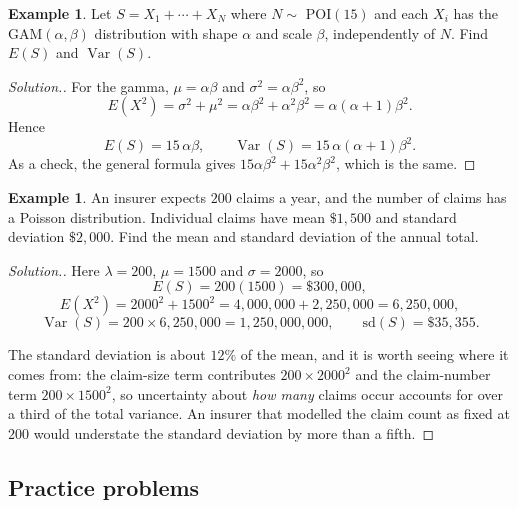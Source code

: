 \documentclass[11pt,a4paper]{article}
\theoremstyle{definition}
\newtheorem{exa}[thm]{Example}
\newenvironment{solution}
  {\renewcommand{\qedsymbol}{}\begin{proof}[\textit{Solution}.]}
  {\end{proof}}
\DeclareMathOperator{\Var}{Var}
\begin{document}
\begin{exa}
Let $S = X_1+\cdots+X_N$ where $N\sim$ POI$(15)$ and each $X_i$ has the
GAM$(\alpha,\beta)$ distribution with shape $\alpha$ and scale $\beta$,
independently of $N$. Find $E(S)$ and $\Var(S)$.
\end{exa}

\begin{solution}
For the gamma, $\mu = \alpha\beta$ and $\sigma^{2} = \alpha\beta^{2}$, so
$$E\left(X^{2}\right) = \sigma^{2}+\mu^{2}
= \alpha\beta^{2} + \alpha^{2}\beta^{2} = \alpha(\alpha+1)\beta^{2}.$$
Hence
$$E(S) = 15\,\alpha\beta,\qquad
\Var(S) = 15\,\alpha(\alpha+1)\beta^{2}.$$
As a check, the general formula gives
$15\alpha\beta^{2} + 15\alpha^{2}\beta^{2}$, which is the same.
\end{solution}

\begin{exa}
An insurer expects $200$ claims a year, and the number of claims has a
Poisson distribution. Individual claims have mean $\$1{,}500$ and standard deviation
$\$2{,}000$. Find the mean and standard deviation of the annual total.
\end{exa}

\begin{solution}
Here $\lambda = 200$, $\mu = 1500$ and $\sigma = 2000$, so
$$E(S) = 200(1500) = \$300{,}000 ,$$
$$E\left(X^{2}\right) = 2000^{2} + 1500^{2} = 4{,}000{,}000 + 2{,}250{,}000
= 6{,}250{,}000 ,$$
$$\Var(S) = 200\times 6{,}250{,}000 = 1{,}250{,}000{,}000 ,
\qquad \text{sd}(S) = \$35{,}355 .$$

The standard deviation is about $12\%$ of the mean, and it is worth seeing where
it comes from: the claim-size term contributes $200\times2000^{2}$ and the
claim-number term $200\times1500^{2}$, so uncertainty about \emph{how many}
claims occur accounts for over a third of the total variance. An insurer that
modelled the claim count as fixed at $200$ would understate the standard
deviation by more than a fifth.
\end{solution}






\subsection{Practice problems}
\end{document}
